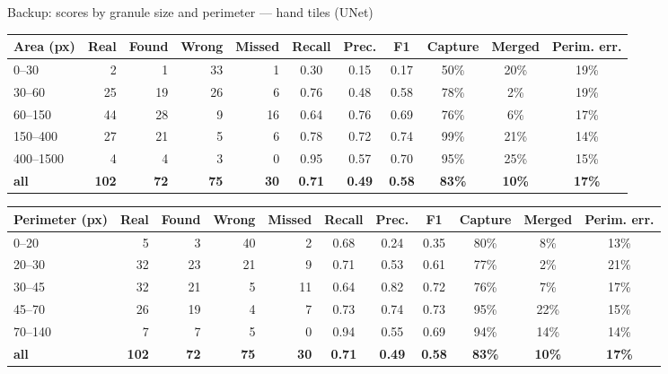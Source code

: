 \begin{frame}{Backup: scores by granule size and perimeter --- hand tiles (UNet)}
  \centering\scriptsize
  \renewcommand{\arraystretch}{1.05}\setlength{\tabcolsep}{3.5pt}
\begin{tabular}{@{}lrrrrcccccc@{}}
\toprule
\textbf{Area (px)} & \textbf{Real} & \textbf{Found} & \textbf{Wrong} & \textbf{Missed} & \textbf{Recall} & \textbf{Prec.} & \textbf{F1} & \textbf{Capture} & \textbf{Merged} & \textbf{Perim. err.} \\
\midrule
0--30 & 2 & 1 & 33 & 1 & 0.30 & 0.15 & 0.17 & 50\% & 20\% & 19\% \\
30--60 & 25 & 19 & 26 & 6 & 0.76 & 0.48 & 0.58 & 78\% & 2\% & 19\% \\
60--150 & 44 & 28 & 9 & 16 & 0.64 & 0.76 & 0.69 & 76\% & 6\% & 17\% \\
150--400 & 27 & 21 & 5 & 6 & 0.78 & 0.72 & 0.74 & 99\% & 21\% & 14\% \\
400--1500 & 4 & 4 & 3 & 0 & 0.95 & 0.57 & 0.70 & 95\% & 25\% & 15\% \\
\textbf{all} & \textbf{102} & \textbf{72} & \textbf{75} & \textbf{30} & \textbf{0.71} & \textbf{0.49} & \textbf{0.58} & \textbf{83\%} & \textbf{10\%} & \textbf{17\%} \\
\bottomrule
\end{tabular}

  \vspace{2mm}
\begin{tabular}{@{}lrrrrcccccc@{}}
\toprule
\textbf{Perimeter (px)} & \textbf{Real} & \textbf{Found} & \textbf{Wrong} & \textbf{Missed} & \textbf{Recall} & \textbf{Prec.} & \textbf{F1} & \textbf{Capture} & \textbf{Merged} & \textbf{Perim. err.} \\
\midrule
0--20 & 5 & 3 & 40 & 2 & 0.68 & 0.24 & 0.35 & 80\% & 8\% & 13\% \\
20--30 & 32 & 23 & 21 & 9 & 0.71 & 0.53 & 0.61 & 77\% & 2\% & 21\% \\
30--45 & 32 & 21 & 5 & 11 & 0.64 & 0.82 & 0.72 & 76\% & 7\% & 17\% \\
45--70 & 26 & 19 & 4 & 7 & 0.73 & 0.74 & 0.73 & 95\% & 22\% & 15\% \\
70--140 & 7 & 7 & 5 & 0 & 0.94 & 0.55 & 0.69 & 94\% & 14\% & 14\% \\
\textbf{all} & \textbf{102} & \textbf{72} & \textbf{75} & \textbf{30} & \textbf{0.71} & \textbf{0.49} & \textbf{0.58} & \textbf{83\%} & \textbf{10\%} & \textbf{17\%} \\
\bottomrule
\end{tabular}
  \vfill
\end{frame}

